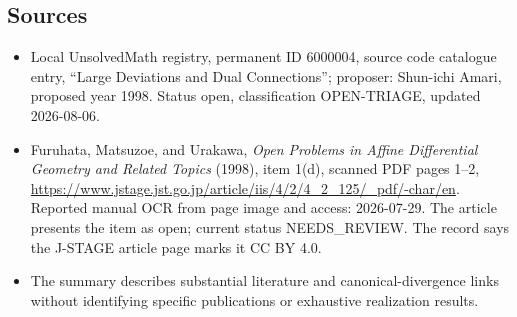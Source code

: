 \documentclass[11pt]{article}
\begin{document}
\subsection{Sources}
\begin{itemize}
\item Local UnsolvedMath registry, permanent ID 6000004, source code catalogue entry, ``Large Deviations and Dual Connections''; proposer: Shun-ichi Amari, proposed year 1998. Status open, classification OPEN-TRIAGE, updated 2026-08-06.
\item Furuhata, Matsuzoe, and Urakawa, \emph{Open Problems in Affine Differential Geometry and Related Topics} (1998), item 1(d), scanned PDF pages 1--2, \url{https://www.jstage.jst.go.jp/article/iis/4/2/4_2_125/_pdf/-char/en}. Reported manual OCR from page image and access: 2026-07-29. The article presents the item as open; current status NEEDS\_REVIEW. The record says the J-STAGE article page marks it CC BY 4.0.
\item The summary describes substantial literature and canonical-divergence links without identifying specific publications or exhaustive realization results.
\end{itemize}
\end{document}
